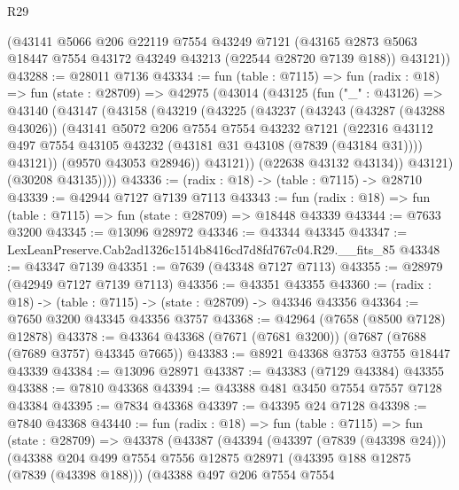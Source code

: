 \begin{lexlean}{R29}
\begin{coremodule}
      (@43141
        @5066
        @206
        @22119
        @7554
        @43249
        @7121
        (@43165 @2873 @5063 @18447 @7554 @43172 @43249 @43213 (@22544 @28720 @7139 @188))
        @43121))
@43288 := @28011 @7136
@43334 := fun (table : @7115) =>
  fun (radix : @18) =>
  fun (state : @28709) =>
  @42975
    (@43014
      (@43125
        (fun ("_" : @43126) =>
        @43140
          (@43147
            (@43158
              (@43219
                (@43225
                  (@43237
                    (@43243
                      (@43287 (@43288 @43026))
                      (@43141
                        @5072
                        @206
                        @7554
                        @7554
                        @43232
                        @7121
                        (@22316
                          @43112
                          @497
                          @7554
                          @43105
                          @43232
                          (@43181 @31 @43108 (@7839 (@43184 @31))))
                        @43121))
                    (@9570 @43053 @28946))
                  @43121))
              (@22638 @43132 @43134))
            @43121)
          (@30208 @43135))))
@43336 := (radix : @18) -> (table : @7115) -> @28710
@43339 := @42944 @7127 @7139 @7113
@43343 := fun (radix : @18) => fun (table : @7115) => fun (state : @28709) => @18448 @43339
@43344 := @7633 @3200
@43345 := @13096 @28972
@43346 := @43344 @43345
@43347 := LexLeanPreserve.Cab2ad1326c1514b8416cd7d8fd767c04.R29.__fits_85
@43348 := @43347 @7139
@43351 := @7639 (@43348 @7127 @7113)
@43355 := @28979 (@42949 @7127 @7139 @7113)
@43356 := @43351 @43355
@43360 := (radix : @18) -> (table : @7115) -> (state : @28709) -> @43346 @43356
@43364 := @7650 @3200 @43345 @43356 @3757
@43368 := @42964 (@7658 (@8500 @7128) @12878)
@43378 := @43364 @43368 (@7671 (@7681 @3200)) (@7687 (@7688 (@7689 @3757) @43345 @7665))
@43383 := @8921 @43368 @3753 @3755 @18447 @43339
@43384 := @13096 @28971
@43387 := @43383 (@7129 @43384) @43355
@43388 := @7810 @43368
@43394 := @43388 @481 @3450 @7554 @7557 @7128 @43384
@43395 := @7834 @43368
@43397 := @43395 @24 @7128
@43398 := @7840 @43368
@43440 := fun (radix : @18) =>
  fun (table : @7115) =>
  fun (state : @28709) =>
  @43378
    (@43387
      (@43394
        (@43397 (@7839 (@43398 @24)))
        (@43388
          @204
          @499
          @7554
          @7556
          @12875
          @28971
          (@43395 @188 @12875 (@7839 (@43398 @188)))
          (@43388
            @497
            @206
            @7554
            @7554

\end{coremodule}
\end{lexlean}
